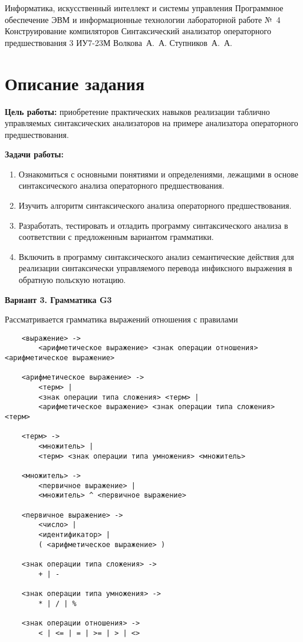 \documentclass{bmstu-gost-7-32}
\begin{document}
\makereporttitle
	{Информатика, искусственный интеллект и системы управления} %
	{Программное обеспечение ЭВМ и информационные технологии} %
	{лабораторной работе №~4} %
	{Конструирование компиляторов} %
	{Синтаксический анализатор операторного предшествования} %
	{3} %
	{ИУ7-23М} %
	{Волкова~А.~А.} %
	{Ступников~А.~А.} %

\section*{Описание задания}

\textbf{Цель работы:} приобретение практических навыков реализации таблично управляемых синтаксических анализаторов на примере анализатора операторного предшествования.

\textbf{Задачи работы:}
\begin{enumerate}
	\item Ознакомиться с основными понятиями и определениями, лежащими в основе синтаксического анализа операторного предшествования.
	\item Изучить алгоритм синтаксического анализа операторного предшествования.
	\item Разработать, тестировать и отладить программу синтаксического анализа в соответствии с предложенным вариантом грамматики.
	\item Включить в программу синтаксического анализ семантические действия для реализации синтаксически управляемого перевода инфиксного выражения в обратную польскую нотацию.
\end{enumerate}

\textbf{Вариант 3. Грамматика G3}

Рассматривается грамматика выражений отношения с правилами

\begin{verbatim}
	<выражение> ->
	    <арифметическое выражение> <знак операции отношения> <арифметическое выражение>

	<арифметическое выражение> ->
	    <терм> |
	    <знак операции типа сложения> <терм> |
	    <арифметическое выражение> <знак операции типа сложения> <терм>

	<терм> ->
	    <множитель> |
	    <терм> <знак операции типа умножения> <множитель>

	<множитель> ->
	    <первичное выражение> |
	    <множитель> ^ <первичное выражение>

	<первичное выражение> ->
	    <число> |
	    <идентификатор> |
	    ( <арифметическое выражение> )

	<знак операции типа сложения> ->
	    + | -

	<знак операции типа умножения> ->
	    * | / | %

	<знак операции отношения> ->
	    < | <= | = | >= | > | <>
\end{verbatim}
\end{document}
